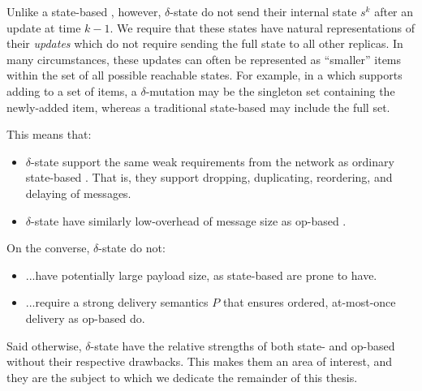 Unlike a state-based \CRDT, however, $\delta$-state \CRDTs do not send their
internal state $s^k$ after an update at time $k-1$. We require that these states
have natural representations of their \emph{updates} which do not require
sending the full state to all other replicas. In many circumstances, these
updates can often be represented as ``smaller'' items within the set of all
possible reachable states. For example, in a \CRDT which supports adding to a
set of items, a $\delta$-mutation may be the singleton set containing the
newly-added item, whereas a traditional state-based \CRDT may include the full
set.

This means that:
\begin{itemize}
  \item $\delta$-state \CRDTs support the same weak requirements from the
    network as ordinary state-based \CRDTs. That is, they support dropping,
    duplicating, reordering, and delaying of messages.
  \item $\delta$-state \CRDTs have similarly low-overhead of message size as
    op-based \CRDTs.
\end{itemize}
On the converse, $\delta$-state \CRDTs do not:
\begin{itemize}
  \item ...have potentially large payload size, as state-based \CRDTs are prone
    to have.
  \item ...require a strong delivery semantics $P$ that ensures ordered,
    at-most-once delivery as op-based \CRDTs do.
\end{itemize}
Said otherwise, $\delta$-state \CRDTs have the relative strengths of both state-
and op-based \CRDTs without their respective drawbacks. This makes them an area
of interest, and they are the subject to which we dedicate the remainder of this
thesis.
